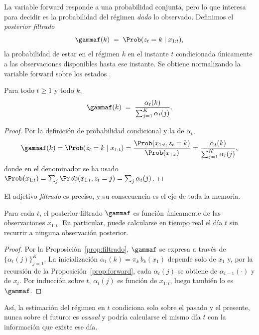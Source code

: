 La variable forward responde a una probabilidad conjunta, pero lo que interesa para decidir es la probabilidad del régimen \emph{dado} lo observado. Definimos el \emph{posterior filtrado}
\[
\gammaf(k) \;=\; \Prob(z_t = k \mid x_{1:t}),
\]
la probabilidad de estar en el régimen $k$ en el instante $t$ condicionada únicamente a las observaciones disponibles hasta ese instante. Se obtiene normalizando la variable forward sobre los estados \cite{rabiner1989, bishop2006}.

\begin{proposicion}
\label{prop:filtrado}
Para todo $t \ge 1$ y todo $k$,
\[
\gammaf(k) \;=\; \frac{\alpha_t(k)}{\sum_{j=1}^{K} \alpha_t(j)}.
\]
\end{proposicion}

\begin{proof}
Por la definición de probabilidad condicional y la de $\alpha_t$,
\[
\gammaf(k) = \Prob(z_t = k \mid x_{1:t})
= \frac{\Prob(x_{1:t}, z_t = k)}{\Prob(x_{1:t})}
= \frac{\alpha_t(k)}{\sum_{j=1}^{K} \alpha_t(j)},
\]
donde en el denominador se ha usado $\Prob(x_{1:t}) = \sum_j \Prob(x_{1:t}, z_t = j) = \sum_j \alpha_t(j)$.
\end{proof}

El adjetivo \emph{filtrado} es preciso, y su consecuencia es el eje de toda la memoria.

\begin{corolario}
\label{cor:causal}
Para cada $t$, el posterior filtrado $\gammaf$ es función únicamente de las observaciones $x_{1:t}$. En particular, puede calcularse en tiempo real el día $t$ sin recurrir a ninguna observación posterior.
\end{corolario}

\begin{proof}
Por la Proposición~\ref{prop:filtrado}, $\gammaf$ se expresa a través de $\{\alpha_t(j)\}_{j=1}^{K}$. La inicialización $\alpha_1(k) = \pi_k\, b_k(x_1)$ depende solo de $x_1$ y, por la recursión de la Proposición~\ref{prop:forward}, cada $\alpha_{t}(j)$ se obtiene de $\alpha_{t-1}(\cdot)$ y de $x_t$. Por inducción sobre $t$, $\alpha_t(j)$ es función de $x_{1:t}$, luego también lo es $\gammaf$.
\end{proof}

Así, la estimación del régimen en $t$ condiciona solo sobre el pasado y el presente, nunca sobre el futuro: es \emph{causal} y podría calcularse el mismo día $t$ con la información que existe ese día.

